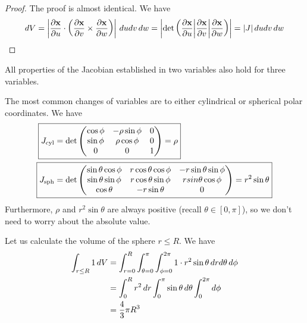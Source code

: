 \documentclass{../template/note}
\begin{document}
    \begin{proof}
        The proof is almost identical. We have
        \begin{align*}
            dV = \left|\pd{\V x}u \cdot \left(\pd{\V x}v \times \pd{\V x}w\right)\right|\D u dv \, dw = \left|\det\left(\pd{\V x}u \middle| \pd{\V x}v \middle| \pd{\V x}w\right)\right| = |J| \D u dv \, dw
        \end{align*}
    \end{proof}

    
    All properties of the Jacobian established in two variables also hold for three variables.

    The most common changes of variables are to either cylindrical or spherical polar coordinates. We have
    \begin{align*}
        \Aboxed{J_\text{cyl} &= \det {\begin{pmatrix}
         \cos \phi & -\rho \sin \phi & 0 \\
         \sin \phi & \rho \cos \phi & 0 \\
         0 & 0 & 1 \\
        \end{pmatrix}} = \rho} \\
        \Aboxed{J_\text{sph} &= \det {\begin{pmatrix}
         \sin \theta \cos \phi & r \cos \theta \cos \phi & -r \sin \theta \sin \phi \\
         \sin \theta \sin \phi & r \cos \theta \sin \phi & r sin \theta \cos \phi \\
         \cos \theta & -r \sin \theta & 0 \\
        \end{pmatrix}} = r^2 \sin \theta}
    \end{align*}
    Furthermore, \(\rho\) and \(r^2 \sin \theta\) are always positive (recall \(\theta \in [0, \pi]\)), so we don't need to worry about the absolute value.

    \begin{example*}
        Let us calculate the volume of the sphere \(r \leq R\). We have
        \begin{align*}
            \int_{r \leq R} 1 \,d{V} &= \int_{r=0}^R \int_{\theta=0}^\pi \int_{\phi=0}^{2\pi} 1 \cdot r^2 \sin \theta \,d{r} d\theta \, d\phi \\
            &= \int_0^R r^2 \,d{r} \int_0^\pi \sin \theta \,d{\theta} \int_0^{2\pi} d\phi \\
            &= \frac 4 3 \pi R^3
        \end{align*}
    \end{example*}
    
\end{document}
